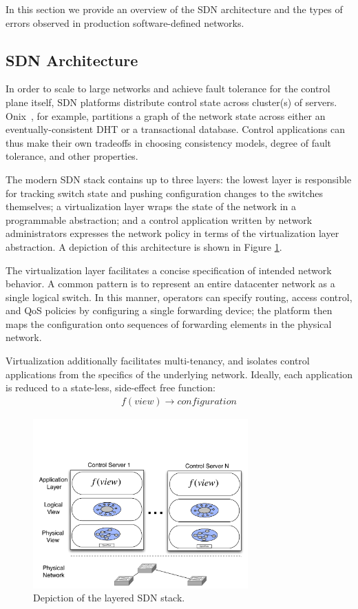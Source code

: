 In this section we provide an overview of the SDN architecture and the types
of errors observed in production software-defined networks.

\subsection{SDN Architecture}

In order to scale to large networks and achieve fault tolerance for the control
plane itself, SDN platforms distribute control state across cluster(s) of servers.
Onix~\cite{onix}, for example,
partitions a graph of the network state across either an eventually-consistent
DHT or a transactional database. Control applications can thus make their own
tradeoffs in choosing consistency models, degree of
fault tolerance, and other properties.

The modern SDN stack 
contains up to three layers: the lowest
layer is responsible for tracking switch state and pushing configuration
changes to the switches themselves; a virtualization layer
wraps the state of the network in a programmable abstraction; and a control
application written by network administrators 
expresses the network policy in terms of the virtualization layer abstraction.
A depiction of this architecture is shown in Figure \ref{fig:basicarch}.

The virtualization layer facilitates a concise specification of
intended network behavior. A common pattern is to represent an entire
datacenter network as a single logical switch. In this manner, operators
can specify routing, access control, and QoS policies by configuring a single forwarding
device; the platform then maps the configuration onto sequences 
of forwarding elements in the physical network.

Virtualization additionally facilitates multi-tenancy, and isolates control applications from the specifics
of the underlying network. Ideally, each application is reduced to a
state-less, side-effect free function:
\begin{align*}
f(view) \rightarrow configuration
\end{align*}

\begin{figure}[t]
    \includegraphics[width=3.25in]{../diagrams/architecture/SDN_Stack.pdf}
    \caption[]{\label{fig:basicarch} Depiction of the layered SDN stack.} 
\end{figure}

